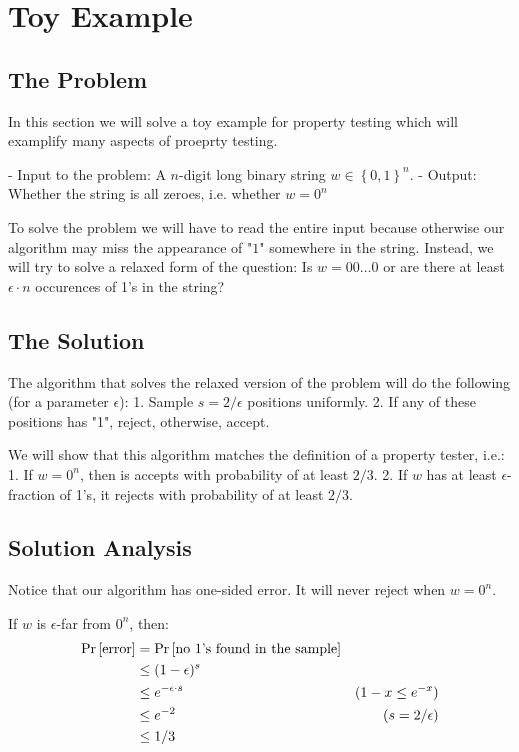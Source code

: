 \section{Toy Example}

\subsection{The Problem}\label{subsec:binary_sequence_problem}

In this section we will solve a toy example for property testing which will examplify many aspects of proeprty testing.

- Input to the problem: A $n$-digit long binary string $w\in \left\{0,1\right\}^n$.
- Output: Whether the string is all zeroes, i.e. whether $w = 0^n $

To solve the problem we will have to read the entire input because otherwise our algorithm may miss the appearance of "$1$" somewhere in the string.
Instead, we will try to solve a relaxed form of the question: Is $w=00\ldots0$ or are there at least $\epsilon \cdot n$ occurences of 1's in the string?

\subsection{The Solution}

The algorithm that solves the relaxed version of the problem will do the following (for a parameter $\epsilon$):
1. Sample $s= 2/\epsilon$ positions uniformly.
2. If any of these positions has "1", reject, otherwise, accept.

We will show that this algorithm matches the definition of a property tester, i.e.:
1. If $w=0^n$, then is accepts with probability of at least $2/3$.
2. If $w$ has at least $\epsilon$-fraction of 1's, it rejects with probability of at least $2/3$.


\subsection{Solution Analysis}

Notice that our algorithm has one-sided error.
It will never reject when $w=0^n$.

If $w$ is $\epsilon$-far from $0^n$, then:
\[
\begin{aligned}
\text{Pr}\left[\text{error}\right] &= \text{Pr}\left[\text{no 1's found in the sample}\right] &\\
&\leq (1-\epsilon)^s &\\
&\leq e^{-\epsilon \cdot s} & (1-x \leq e^{-x})\\
&\leq e^{-2} & (s=2/\epsilon)\\
&\leq 1/3
\end{aligned}
\]

